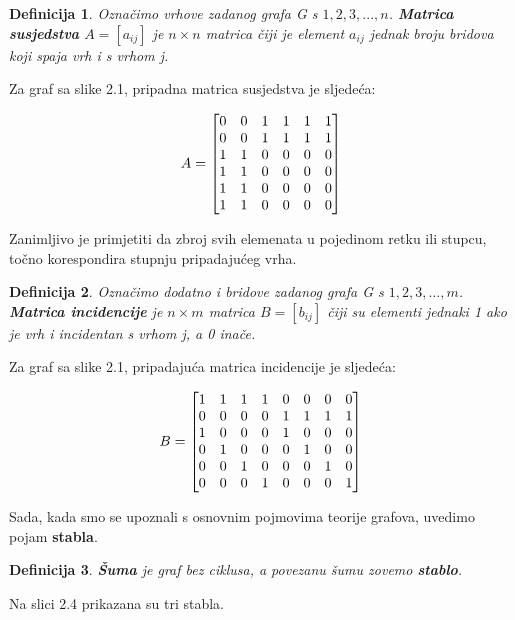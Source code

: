 \documentclass[times, utf8, zavrsni]{fer}
\newtheorem{definition}{Definicija}[chapter]
\begin{document}
\begin{definition}
	Označimo vrhove zadanog grafa G s ${1, 2, 3,..., n}$. \textbf{Matrica susjedstva} $A = [a_{ij}]$ je $n \times n$ matrica čiji je element $a_{ij}$ jednak broju bridova koji spaja vrh i s vrhom j.
\end{definition}

Za graf sa slike 2.1, pripadna matrica susjedstva je sljedeća:

\[
\centering
A = 
\begin{bmatrix}
	0 & 0 & 1 & 1 & 1 & 1 \\
	0 & 0 & 1 & 1 & 1 & 1\\
	1 & 1 & 0 & 0 & 0 & 0 \\
	1 & 1 & 0 & 0 & 0 & 0 \\
	1 & 1 & 0 & 0 & 0 & 0 \\
	1 & 1 & 0 & 0 & 0 & 0
\end{bmatrix}
\]

Zanimljivo je primjetiti da zbroj svih elemenata u pojedinom retku ili stupcu, točno korespondira stupnju pripadajućeg vrha.

\begin{definition}
	Označimo dodatno i bridove zadanog grafa G s ${1, 2, 3, ..., m}$. \textbf{Matrica incidencije} je $n \times m$ matrica $B = [b_{ij}]$ čiji su elementi jednaki 1 ako je vrh i incidentan s vrhom j, a 0 inače.
\end{definition}

Za graf sa slike 2.1, pripadajuća matrica incidencije je sljedeća:

\[
\centering
B = 
\begin{bmatrix}
	1 & 1 & 1 & 1 & 0 & 0 & 0 & 0 \\
	0 & 0 & 0 & 0 & 1 & 1 & 1 & 1 \\
	1 & 0 & 0 & 0 & 1 & 0 & 0 & 0 \\
	0 & 1 & 0 & 0 & 0 & 1 & 0 & 0 \\
	0 & 0 & 1 & 0 & 0 & 0 & 1 & 0 \\
	0 & 0 & 0 & 1 & 0 & 0 & 0 & 1
\end{bmatrix}
\]

Sada, kada smo se upoznali s osnovnim pojmovima teorije grafova, uvedimo pojam \textbf{stabla}.

\begin{definition}
	\textbf{Šuma} je graf bez ciklusa, a povezanu šumu zovemo \textbf{stablo}.
\end{definition}

Na slici 2.4 prikazana su tri stabla.
\end{document}

